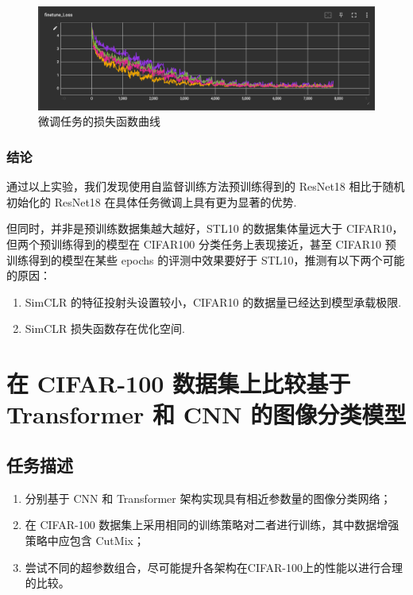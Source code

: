 \documentclass[notitlepage,cs4size,punct,oneside]{ctexrep}
\numberwithin{equation}{chapter}
\theoremstyle{mystyle}
\begin{document}
\begin{figure}[htpb!]
    \centering
    \includegraphics[width=1\linewidth]{fine-tune_loss.png}
    \caption{微调任务的损失函数曲线}
    \label{fig:enter-label}
\end{figure}

\subsection{结论}

通过以上实验，我们发现使用自监督训练方法预训练得到的 ResNet18 相比于随机初始化的 ResNet18 在具体任务微调上具有更为显著的优势. 

但同时，并非是预训练数据集越大越好，STL10 的数据集体量远大于 CIFAR10，但两个预训练得到的模型在 CIFAR100 分类任务上表现接近，甚至 CIFAR10 预训练得到的模型在某些 epochs 的评测中效果要好于 STL10，推测有以下两个可能的原因：

\begin{enumerate}
    \item SimCLR 的特征投射头设置较小，CIFAR10 的数据量已经达到模型承载极限.
    \item SimCLR 损失函数存在优化空间.
\end{enumerate}

\chapter{在 CIFAR-100 数据集上比较基于 Transformer 和 CNN 的图像分类模型}
\section{任务描述}
\begin{enumerate}
\item 分别基于 CNN 和 Transformer 架构实现具有相近参数量的图像分类网络；
\item 在 CIFAR-100 数据集上采用相同的训练策略对二者进行训练，其中数据增强策略中应包含 CutMix；
\item 尝试不同的超参数组合，尽可能提升各架构在CIFAR-100上的性能以进行合理的比较。
\end{enumerate}
\end{document}
